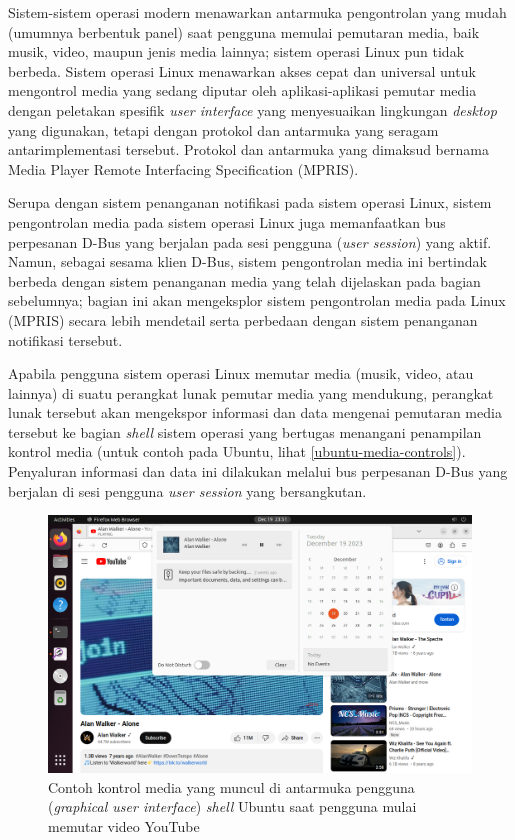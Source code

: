 Sistem-sistem operasi modern menawarkan antarmuka pengontrolan yang mudah (umumnya berbentuk panel) saat pengguna memulai pemutaran media, baik musik, video, maupun jenis media lainnya; sistem operasi Linux pun tidak berbeda. Sistem operasi Linux menawarkan akses cepat dan universal untuk mengontrol media yang sedang diputar oleh aplikasi-aplikasi pemutar media dengan peletakan spesifik \textit{user interface} yang menyesuaikan lingkungan \textit{desktop} yang digunakan, tetapi dengan protokol dan antarmuka yang seragam antarimplementasi tersebut. Protokol dan antarmuka yang dimaksud bernama Media Player Remote Interfacing Specification (MPRIS).

Serupa dengan sistem penanganan notifikasi pada sistem operasi Linux, sistem pengontrolan media pada sistem operasi Linux juga memanfaatkan bus perpesanan D-Bus yang berjalan pada sesi pengguna (\textit{user session}) yang aktif. Namun, sebagai sesama klien D-Bus, sistem pengontrolan media ini bertindak berbeda dengan sistem penanganan media yang telah dijelaskan pada bagian sebelumnya; bagian ini akan mengeksplor sistem pengontrolan media pada Linux (MPRIS) secara lebih mendetail serta perbedaan dengan sistem penanganan notifikasi tersebut.

Apabila pengguna sistem operasi Linux memutar media (musik, video, atau lainnya) di suatu perangkat lunak pemutar media yang mendukung, perangkat lunak tersebut akan mengekspor informasi dan data mengenai pemutaran media tersebut ke bagian \textit{shell} sistem operasi yang bertugas menangani penampilan kontrol media (untuk contoh pada Ubuntu, lihat \autoref{ubuntu-media-controls}). Penyaluran informasi dan data ini dilakukan melalui bus perpesanan D-Bus yang berjalan di sesi pengguna \textit{user session} yang bersangkutan.

\begin{figure}
    \centering
    \includegraphics[width=1\linewidth]{assets/Screenshot from 2023-12-19 23-51-47.png}
    \caption{Contoh kontrol media yang muncul di antarmuka pengguna (\textit{graphical user interface}) \textit{shell} Ubuntu saat pengguna mulai memutar video YouTube}
    \label{ubuntu-media-controls}
\end{figure}

